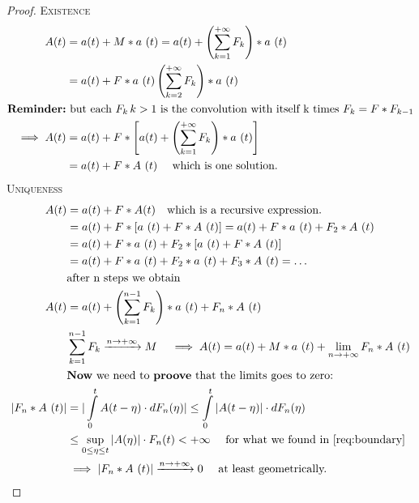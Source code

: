 \begin{proof}
  \proofpart
  \textsc{Existence}
    \begin{equation}\begin{split}
      A(t) &= a(t) + M \ast a~(t) = a(t) + \left(\sum\limits_{k=1}^{+\infty} F_k \right) \ast a~(t) \\
      &= a(t) + F \ast a~(t) \left(\sum\limits_{k=2}^{+\infty} F_k \right) \ast a~(t)\\
      \text{\textbf{Reminder:}}&\text{ but each $F_k \, k>1$ is the convolution with itself k times $F_k = F \ast F_{k-1}$} \\
      \implies A(t) &= a(t) + F \ast \left[ a(t) + \left(\sum\limits_{k=1}^{+\infty} F_k \right) \ast a~(t) \right] \\
      &=a(t) + F \ast A ~ (t) \quad \text{ which is one solution.}
    \end{split}\end{equation}
  \proofpart
  \textsc{Uniqueness}
  \begin{equation}\begin{split}
    A(t) &= a(t) + F \ast A(t) \quad \text{which is a recursive expression.} \\
    &= a(t) + F \ast \left[a~(t) + F \ast A~(t) \right] = a(t) + F \ast a ~ (t) + F_2 \ast A~(t) \\
    &= a(t) + F \ast a ~ (t) + F_2 \ast  \left[a~(t) + F \ast A~(t) \right] \\
    &= a(t) + F \ast a~(t) + F_2 \ast a~(t) + F_3 \ast A~(t) = \dots \\
    &\text{after n steps we obtain} \\
    A(t) &= a(t) + \left( \sum\limits_{k=1}^{n-1}F_k\right) \ast a~(t) + F_n \ast A~(t) \\
    & \sum\limits_{k=1}^{n-1}F_k \xrightarrow{n \to +\infty} M \quad \implies A(t) = a(t) + M \ast a~(t) + \lim_{n \to +\infty} F_n \ast A~(t) \\
    &\text{\textbf{Now}  we need to \textbf{proove} that the limits goes to zero:} \\
    |F_n \ast A~(t)| &= |\int\limits_0^{t}A(t-\eta) \cdot dF_n(\eta)| \le \int\limits_0^{t}|A(t-\eta)| \cdot dF_n(\eta)  \\
    & \le \sup\limits_{0 \le \eta \le t} |A(\eta)| \cdot F_n (t) < +\infty \quad \text{ for what we found in \ref{req:boundary}} \\
    &\implies |F_n \ast A~(t)| \xrightarrow{n \to +\infty} 0 \quad\text{ at least geometrically.}
  \end{split}\end{equation}
\end{proof}

